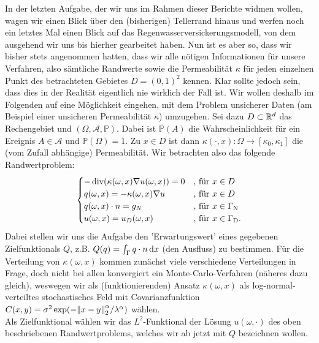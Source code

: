 In der letzten Aufgabe, der wir uns im Rahmen dieser Berichte widmen wollen, wagen wir einen Blick über den (bisherigen) Tellerrand hinaus und werfen noch ein letztes Mal einen Blick auf das Regenwasserversickerungsmodell, von dem ausgehend wir uns bis hierher gearbeitet haben. Nun ist es aber so, dass wir bisher stets angenommen hatten, dass wir alle nötigen Informationen für unsere Verfahren, also sämtliche Randwerte sowie die Permeabilität $\kappa$ für jeden einzelnen Punkt des betrachteten Gebietes $D=(0,1)^2$ kennen.
Klar sollte jedoch sein, dass dies in der Realität eigentlich nie wirklich der Fall ist. Wir wollen deshalb im Folgenden auf eine Möglichkeit eingehen, mit dem Problem unsicherer Daten (am Beispiel einer unsicheren Permeabilität $\kappa$)  umzugehen.
\newline
Sei dazu $D \subset \mathbb{R} ^d$ das Rechengebiet und $(\Omega,\mathcal{A} ,\mathbb{P})$. Dabei ist $\mathbb{P} (A)$ die Wahrscheinlichkeit für ein Ereignis $A \in \mathcal{A}$ und $\mathbb{P} (\Omega ) = 1$.
\newline
Zu $x \in D$ ist dann	$\kappa (\cdot ,x ) : \Omega \rightarrow [\kappa_0,\kappa_1] $ die (vom Zufall abhängige) Permeabilität.
Wir betrachten also das folgende Randwertproblem:
\begin{gather*}
	\begin{cases}
	- \operatorname{div}( \kappa(\omega,x)\nabla u(\omega,x))=0 &\text{, für } x \in D \\
	q(\omega , x) = - \kappa(\omega ,x) \nabla u &\text{, für }  x \in D\\
	q(\omega,x) \cdot n = g_N &\text{, für } x \in \Gamma_{\text{N}}\\
	u(\omega,x) = u_D(\omega,x) &\text{, für } x \in \Gamma_{\text{D}}. 
	\end{cases}
\end{gather*}
Dabei stellen wir uns die Aufgabe den 'Erwartungswert' eines gegebenen Zielfunktionals $Q$, z.B. $Q(q) = \int_{\Gamma} q \cdot n \mathop{}\!\mathrm{d} x $ (den Ausfluss) zu bestimmen.
Für die Verteilung von $\kappa (\omega,x )$ kommen zunächst viele verschiedene Verteilungen in Frage, doch nicht bei allen konvergiert ein Monte-Carlo-Verfahren (näheres dazu gleich), weswegen wir als (funktionierenden) Ansatz $\kappa (\omega,x )$  als log-normal-verteiltes stochastisches Feld mit Covarianzfunktion $C(x,y)= \sigma^2 \exp ( - \norm{x-y}^{\alpha}_2 / \lambda^{\alpha})$ wählen. \\
Als Zielfunktional wählen wir das $L^2$-Funktional der Lösung $u(\omega,\cdot)$ des oben beschriebenen Randwertproblems, welches wir ab jetzt mit $Q$ bezeichnen wollen.
